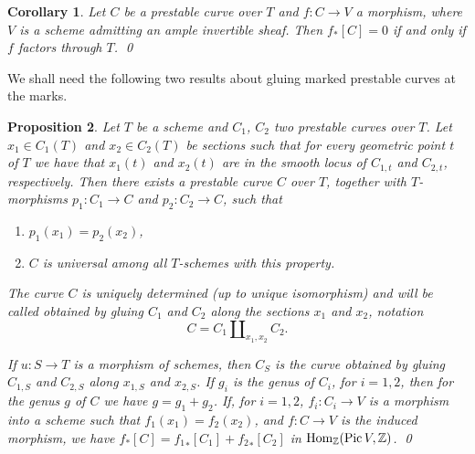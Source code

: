 \documentclass[11pt]{amsart}
\newtheorem{prop}{Proposition}[section]
\newtheorem{cor}[prop]{Corollary}
\theoremstyle{definition}
\theoremstyle{remark}
\newcommand{\lst}{_{\ast}}
\newcommand{\zz}{{\mathbb{Z}}}
\newcommand{\Hom}{\operatorname{\rm Hom}\nolimits}
\newcommand{\Pic}{\operatorname{\rm Pic}\nolimits}
\theoremstyle{plain}
\theoremstyle{definition}
\theoremstyle{remark}
\begin{document}
\begin{cor} \label{zc}
Let \(C\) be a prestable curve over \(T\) and \(f:C\rightarrow V\) a morphism, where
\(V\) is a scheme admitting
an ample invertible sheaf. Then \(f\lst[C]=0\) if and only if \(f\) factors through
\(T\).  \qed
\end{cor}

We shall need the following two results about gluing marked prestable curves at
the marks.
%
\begin{prop} \label{glue}
Let \(T\) be a scheme and \(C_1\), \(C_2\) two prestable curves over \(T\). Let \(x_1\in
C_1(T)\) and \(x_2\in C_2(T)\) be sections
such that for every geometric point \(t\) of \(T\) we have that \(x_1(t)\) and
\(x_2(t)\) are in the smooth locus of \(C_{1,t}\)
and \(C_{2,t}\), respectively. Then there exists a prestable curve \(C\) over \(T\),
together with \(T\)-morphisms
\(p_1:C_1\rightarrow C\) and \(p_2:C_2\rightarrow C\), such that
\begin{enumerate}
\item \(p_1(x_1)=p_2(x_2)\),
\item \(C\) is universal among all \(T\)-schemes with this property.
\end{enumerate}
The curve \(C\) is uniquely determined (up to unique isomorphism) and will be
called {\em obtained by gluing \(C_1\) and
\(C_2\) along the sections \(x_1\) and \(x_2\)}, notation
\[
C=C_1\amalg_{x_1,x_2}C_2.
\]

If \(u:S\rightarrow T\) is a morphism of schemes, then \(C_S\) is the curve
obtained by gluing \(C_{1,S}\) and \(C_{2,S}\) along
\(x_{1,S}\) and \(x_{2,S}\). If \(g_i\) is the genus of \(C_i\), for \(i=1,2\), then for
the genus \(g\) of \(C\) we have \(g=g_1+g_2\).
If, for \(i=1,2\), \(f_i:C_i\rightarrow V\) is a morphism into a scheme such that
\(f_1(x_1)=f_2(x_2)\), and \(f:C\rightarrow
V\) is the induced morphism, we have \(f\lst[C]={f_1}\lst[C_1]+{f_2}\lst[C_2]\) in
\(\Hom_\zz(\Pic V,\zz)\).  \qed
\end{prop}
%
\end{document}

